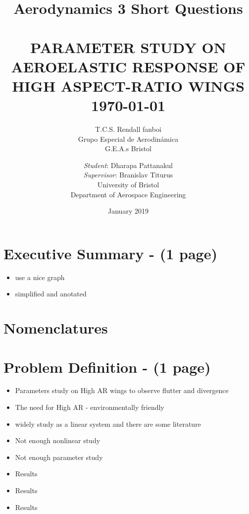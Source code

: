\documentclass[11pt]{article}
\title{Aerodynamics 3 Short Questions}
\date{January 2019}
\author{T.C.S. Rendall fanboi \Group \\ Grupo Especial de Aerodinámica \\ G.E.A.s Bristol}
\begin{document}
{\selectfont
\title{ \normalsize \textsc{}
		\\ [2.0cm]
		\HRule{0.5pt} \\
		\LARGE \textbf{\uppercase{Parameter Study on Aeroelastic Response of  High Aspect-Ratio Wings}
		\HRule{2pt} \\ [0.5cm]
		\normalsize \today \vspace*{5\baselineskip}}
		}
}

\date{}

\author{
        \textit{Student}: Dharapa Pattanakul\\ 
        \textit{Supervisor}: Branislav Titurus\\
		University of Bristol \\
		Department of Aerospace Engineering }

\maketitle
\cleardoublepage
\newpage
\section*{Executive Summary - (1 page)}
\begin{itemize}
    \item use a nice graph
    \item simplified and anotated
\end{itemize}
\cleardoublepage

\newpage
\tableofcontents
\newpage
\listoffigures
{}
\cleardoublepage
\listoftables
{}

\section*{Nomenclatures}
\cleardoublepage

\newpage
\section{Problem Definition - (1 page)}
\begin{itemize}
    \item Parameters study on High AR wings to observe flutter and divergence
    \item The need for High AR - environmentally friendly
    \item widely study as a linear system and there are some literature
    \item Not enough nonlinear study
    \item Not enough parameter study
    \item Results
    \item Results
    \item Results
\end{itemize}
\end{document}
